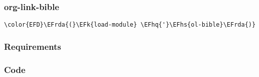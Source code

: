 \documentclass[a4wide,10pt]{article}
\newcommand{\EFk}[1]{\textcolor{EFk}{#1}} %
\newcommand{\EFhq}[1]{\textcolor{EFhq}{#1}} %
\newcommand{\EFhs}[1]{\textcolor{EFhs}{#1}} %
\newcommand{\EFrda}[1]{\textcolor{EFrda}{#1}} %
\begin{document}
\subsubsection{org-link-bible}
\label{sec:org4d6d823}
\begin{Code}
\begin{Verbatim}
\color{EFD}\EFrda{(}\EFk{load-module} \EFhq{'}\EFhs{ol-bible}\EFrda{)}
\end{Verbatim}
\end{Code}
\subsubsection{Requirements}
\label{sec:org8f02f3a}
\subsubsection{Code}
\label{sec:org5845a86}
\end{document}
